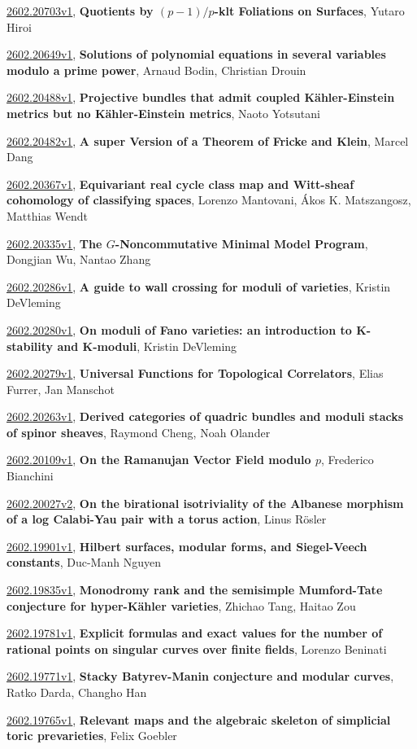\documentclass[9pt, a4paper]{article}
\theoremstyle{plain}
\theoremstyle{definition}
\theoremstyle{remark}
\newcommand{\arxiv}[3]{\href{https://arxiv.org/abs/#1}{#1}, \textbf{\textcolor{arxivblue}{#2}}, #3}
\begin{document}
\arxiv{2602.20703v1}{Quotients by $(p-1)/p$-klt Foliations on Surfaces}{Yutaro Hiroi}

\arxiv{2602.20649v1}{Solutions of polynomial equations in several variables modulo a prime power}{Arnaud Bodin, Christian Drouin}

\arxiv{2602.20488v1}{Projective bundles that admit coupled Kähler-Einstein metrics but no Kähler-Einstein metrics}{Naoto Yotsutani}

\arxiv{2602.20482v1}{A super Version of a Theorem of Fricke and Klein}{Marcel Dang}

\arxiv{2602.20367v1}{Equivariant real cycle class map and Witt-sheaf cohomology of classifying spaces}{Lorenzo Mantovani, Ákos K. Matszangosz, Matthias Wendt}

\arxiv{2602.20335v1}{The $G$-Noncommutative Minimal Model Program}{Dongjian Wu, Nantao Zhang}

\arxiv{2602.20286v1}{A guide to wall crossing for moduli of varieties}{Kristin DeVleming}

\arxiv{2602.20280v1}{On moduli of Fano varieties: an introduction to K-stability and K-moduli}{Kristin DeVleming}

\arxiv{2602.20279v1}{Universal Functions for Topological Correlators}{Elias Furrer, Jan Manschot}

\arxiv{2602.20263v1}{Derived categories of quadric bundles and moduli stacks of spinor sheaves}{Raymond Cheng, Noah Olander}

\arxiv{2602.20109v1}{On the Ramanujan Vector Field modulo $p$}{Frederico Bianchini}

\arxiv{2602.20027v2}{On the birational isotriviality of the Albanese morphism of a log Calabi-Yau pair with a torus action}{Linus Rösler}

\arxiv{2602.19901v1}{Hilbert surfaces, modular forms, and Siegel-Veech constants}{Duc-Manh Nguyen}

\arxiv{2602.19835v1}{Monodromy rank and the semisimple Mumford-Tate conjecture for hyper-Kähler varieties}{Zhichao Tang, Haitao Zou}

\arxiv{2602.19781v1}{Explicit formulas and exact values for the number of rational points on singular curves over finite fields}{Lorenzo Beninati}

\arxiv{2602.19771v1}{Stacky Batyrev-Manin conjecture and modular curves}{Ratko Darda, Changho Han}

\arxiv{2602.19765v1}{Relevant maps and the algebraic skeleton of simplicial toric prevarieties}{Felix Goebler}
\end{document}
